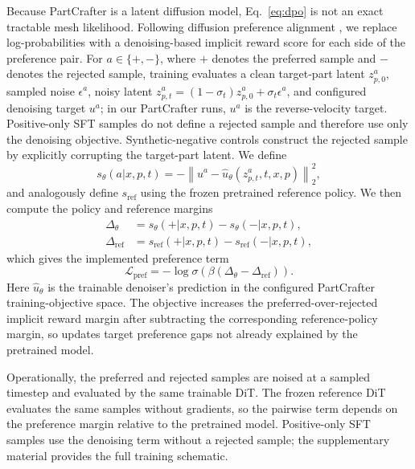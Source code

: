 \documentclass[10pt,twocolumn,letterpaper]{article}
\newcommand{\SK}[1]{\textcolor{blue}{[{\sc SK}] #1}}
\begin{document}
Because PartCrafter is a latent diffusion model, Eq.~\ref{eq:dpo} is not an exact tractable mesh likelihood. Following diffusion preference alignment \cite{wallace2024diffusiondpo}, we replace log-probabilities with a denoising-based implicit reward score for each side of the preference pair. For $a\in\{+,-\}$, where $+$ denotes the preferred sample and $-$ denotes the rejected sample, training evaluates a clean target-part latent $z_{p,0}^a$, sampled noise $\epsilon^a$, noisy latent
$z_{p,t}^a=(1-\sigma_t)z_{p,0}^a+\sigma_t\epsilon^a$, and configured denoising target $u^a$; in our PartCrafter runs, $u^a$ is the reverse-velocity target. Positive-only SFT samples do not define a rejected sample and therefore use only the denoising objective. Synthetic-negative controls construct the rejected sample by explicitly corrupting the target-part latent.
We define
{\small
\begin{equation}
s_\theta(a|x,p,t) =
- \left\|
u^a - \hat{u}_\theta(z_{p,t}^a,t,x,p)
\right\|_2^2 ,
\label{eq:denoise_score}
\end{equation}
}
and analogously define $s_{\mathrm{ref}}$ using the frozen pretrained reference policy. We then compute the policy and reference margins
{\small
\begin{equation}
\begin{aligned}
\Delta_\theta
&= s_\theta(+|x,p,t)-s_\theta(-|x,p,t),\\
\Delta_{\mathrm{ref}}
&= s_{\mathrm{ref}}(+|x,p,t)
-s_{\mathrm{ref}}(-|x,p,t),
\end{aligned}
\label{eq:pref_margin}
\end{equation}
}
which gives the implemented preference term
{\small
\begin{equation}
\mathcal{L}_{\mathrm{pref}}
= - \log \sigma\!\left(\beta(\Delta_\theta-\Delta_{\mathrm{ref}})\right).
\label{eq:pref}
\end{equation}
}
Here $\hat{u}_\theta$ is the trainable denoiser's prediction in the configured PartCrafter training-objective space. The objective increases the preferred-over-rejected implicit reward margin after subtracting the corresponding reference-policy margin, so updates target preference gaps not already explained by the pretrained model.

Operationally, the preferred and rejected samples are noised at a sampled timestep and evaluated by the same trainable DiT. The frozen reference DiT evaluates the same samples without gradients, so the pairwise term depends on the preference margin relative to the pretrained model. Positive-only SFT samples use the denoising term without a rejected sample; the supplementary material provides the full training schematic.
\end{document}
